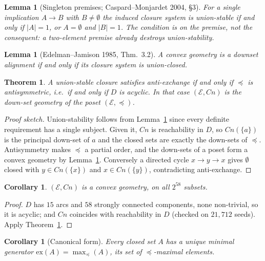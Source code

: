 \documentclass[11pt]{article}
\theoremstyle{definition}
\theoremstyle{plain}
\newtheorem{theorem}[definition]{Theorem}
\newtheorem{lemma}[definition]{Lemma}
\newtheorem{corollary}[definition]{Corollary}
\theoremstyle{remark}
\newcommand{\El}{\mathcal{E}}
\begin{document}
\begin{lemma}[Singleton premises; Caspard--Monjardet 2004, \S3]\label{lem:cm}
For a single implication $A \to B$ with $B \neq \emptyset$ the induced closure
system is union-stable if and only if $|A| = 1$, or $A = \emptyset$ and $|B| = 1$. The condition is on the
\emph{premise}, not the consequent: a two-element premise already destroys
union-stability.
\end{lemma}

\begin{lemma}[Edelman--Jamison 1985, Thm.\ 3.2]\label{lem:ej}
A convex geometry is a downset alignment if and only if its closure system is
union-closed.
\end{lemma}

\begin{theorem}\label{thm:convex}
A union-stable closure satisfies anti-exchange if and only if $\preceq$ is
antisymmetric, i.e.\ if and only if $D$ is acyclic. In that case $(\El, Cn)$ is
the down-set geometry of the poset $(\El, \preceq)$.
\end{theorem}

\begin{proof}[Proof sketch]
Union-stability follows from Lemma~\ref{lem:cm} since every definite requirement
has a single subject. Given it, $Cn$ is reachability in $D$, so $Cn(\{a\})$ is the
principal down-set of $a$ and the closed sets are exactly the down-sets of
$\preceq$. Antisymmetry makes $\preceq$ a partial order, and the down-sets of a
poset form a convex geometry by Lemma~\ref{lem:ej}. Conversely a directed cycle
$x \to y \to x$ gives $\emptyset$ closed with $y \in Cn(\{x\})$ and
$x \in Cn(\{y\})$, contradicting anti-exchange.
\end{proof}

\begin{corollary}\label{cor:ourconvex}
$(\El, Cn)$ is a convex geometry, on all $2^{58}$ subsets.
\end{corollary}

\begin{proof}
$D$ has $15$ arcs and $58$ strongly connected components, none non-trivial, so it
is acyclic; and $Cn$ coincides with reachability in $D$ (checked on $21{,}712$
seeds). Apply Theorem~\ref{thm:convex}.
\end{proof}

\begin{corollary}[Canonical form]\label{cor:ex}
Every closed set $A$ has a unique minimal generator
$\mathrm{ex}(A) = \max_{\preceq}(A)$, its set of $\preceq$-maximal elements.
\end{corollary}
\end{document}
